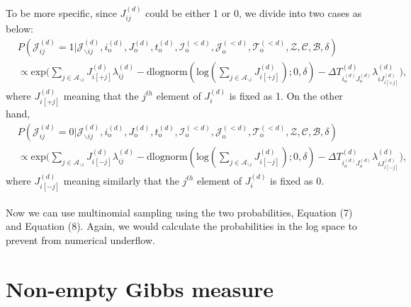 \documentclass[a4paper]{article}
\begin{document}
       To be more specific, since ${J}^{(d)}_{ij}$ could be either 1 or 0, we divide into two cases as below:
       \begin{equation}
       \begin{aligned}
       &P(\mathcal{J}^{(d)}_{ij}=1| \mathcal{J}^{(d)}_{\backslash ij}, i^{(d)}_{\mbox{o}}, J^{(d)}_{\mbox{o}}, t^{(d)}_{\mbox{o}}, \mathcal{I}^{(<d)}_{\mbox{o}}, \mathcal{J}^{(<d)}_{\mbox{o}}, \mathcal{T}^{(<d)}_{\mbox{o}}, \mathcal{Z}, \mathcal{C}, \mathcal{B}, \delta)\\& \propto \mbox{exp}\Big({\sum_{j \in \mathcal{A}_{\backslash i}}J^{(d)}_{i[+j]}\lambda^{(d)}_{ij} - \mbox{dlognorm}(\mbox{log}(\sum\limits_{j \in \mathcal{A}_{\backslash i}}J^{(d)}_{i[+j]});0, \delta)-\Delta T^{(d)}_{i_o^{(d)}J_o^{(d)}}\lambda^{(d)}_{iJ^{(d)}_{ i[+j]}}}\Big),
       \end{aligned}
       \end{equation}
       where $J^{(d)}_{i[+j]}$ meaning that the $j^{th}$ element of $J_{i}^{(d)}$ is fixed as 1. On the other hand, 
       \begin{equation}
       \begin{aligned}
       &P(\mathcal{J}^{(d)}_{ij}=0| \mathcal{J}^{(d)}_{\backslash ij}, i^{(d)}_{\mbox{o}}, J^{(d)}_{\mbox{o}}, t^{(d)}_{\mbox{o}}, \mathcal{I}^{(<d)}_{\mbox{o}}, \mathcal{J}^{(<d)}_{\mbox{o}}, \mathcal{T}^{(<d)}_{\mbox{o}}, \mathcal{Z}, \mathcal{C}, \mathcal{B}, \delta)\\& \propto \mbox{exp}\Big({\sum_{j \in \mathcal{A}_{\backslash i}}J^{(d)}_{i[-j]}\lambda^{(d)}_{ij} - \mbox{dlognorm}(\mbox{log}(\sum\limits_{j \in \mathcal{A}_{\backslash i}}J^{(d)}_{i[-j]});0, \delta)-\Delta T^{(d)}_{i_o^{(d)}J_o^{(d)}}\lambda^{(d)}_{iJ^{(d)}_{ i[-j]}}}\Big),
       \end{aligned}
       \end{equation}
       where $J^{(d)}_{i[-j]}$ meaning similarly that the $j^{th}$ element of $J_{i}^{(d)}$ is fixed as 0. \\\\ \newline Now we can use multinomial sampling using the two probabilities, Equation (7) and Equation (8). Again, we would calculate the probabilities in the log space to prevent from numerical underflow. 
       
 \section{Non-empty Gibbs measure}
 
\end{document}
